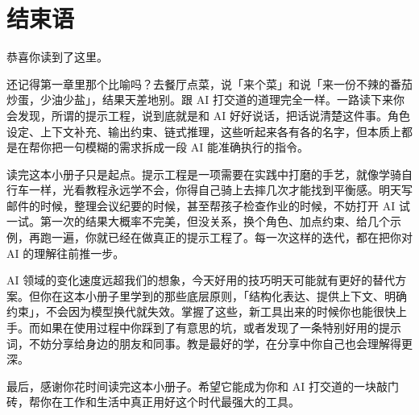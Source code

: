 % 
% 


\chapter{结束语}

恭喜你读到了这里。

还记得第一章里那个比喻吗？去餐厅点菜，说「来个菜」和说「来一份不辣的番茄炒蛋，少油少盐」，结果天差地别。跟 AI 打交道的道理完全一样。一路读下来你会发现，所谓的提示工程，说到底就是和 AI 好好说话，把话说清楚这件事。角色设定、上下文补充、输出约束、链式推理，这些听起来各有各的名字，但本质上都是在帮你把一句模糊的需求拆成一段 AI 能准确执行的指令。

读完这本小册子只是起点。提示工程是一项需要在实践中打磨的手艺，就像学骑自行车一样，光看教程永远学不会，你得自己骑上去摔几次才能找到平衡感。明天写邮件的时候，整理会议纪要的时候，甚至帮孩子检查作业的时候，不妨打开 AI 试一试。第一次的结果大概率不完美，但没关系，换个角色、加点约束、给几个示例，再跑一遍，你就已经在做真正的提示工程了。每一次这样的迭代，都在把你对 AI 的理解往前推一步。

AI 领域的变化速度远超我们的想象，今天好用的技巧明天可能就有更好的替代方案。但你在这本小册子里学到的那些底层原则，「结构化表达、提供上下文、明确约束」，不会因为模型换代就失效。掌握了这些，新工具出来的时候你也能很快上手。而如果在使用过程中你踩到了有意思的坑，或者发现了一条特别好用的提示词，不妨分享给身边的朋友和同事。教是最好的学，在分享中你自己也会理解得更深。

最后，感谢你花时间读完这本小册子。希望它能成为你和 AI 打交道的一块敲门砖，帮你在工作和生活中真正用好这个时代最强大的工具。

